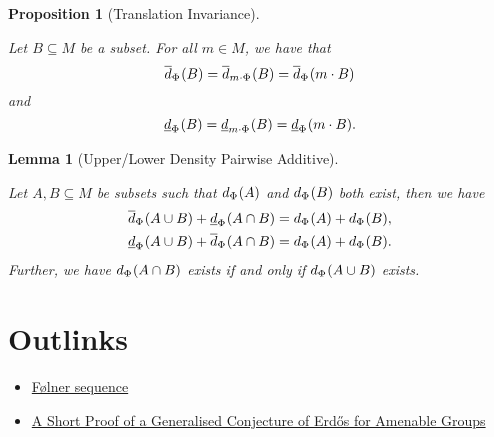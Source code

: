 \documentclass[
  british,
]{article}
\providecommand{\tightlist}{%
  \setlength{\itemsep}{0pt}\setlength{\parskip}{0pt}}
\theoremstyle{definition}
\theoremstyle{plain}
\newtheorem{lemma}{Lemma}[section]
\theoremstyle{plain}
\newtheorem{proposition}{Proposition}[section]
\theoremstyle{remark}
\newcommand{\Folner}[1][\vphantom{}]{{\Phi}_{#1}}
\newcommand{\UpperDensity}[2][\Folner]{\overline{d}_{{#1}}({#2})}
\newcommand{\LowerDensity}[2][\Folner]{\underline{d}_{{#1}}({#2})}
\newcommand{\Density}[2][\Folner]{d_{{#1}}({#2})}
\newcommand{\Monoid}{{M}}
\newcommand{\MonoidOperation}[2]{{#1}\cdot{#2}}
\newcommand{\MonoidElement}{{m}}
\begin{document}
\begin{proposition}[Translation
Invariance]\protect\hypertarget{prp-DensityTranslationInvariance}{}\label{prp-DensityTranslationInvariance}

Let \(B\subseteq\Monoid\) be a subset. For all
\(\MonoidElement\in\Monoid\), we have that
\[\UpperDensity{B}=\UpperDensity[\MonoidOperation{\MonoidElement}{\Folner}]{B}=\UpperDensity{\MonoidOperation{\MonoidElement}{B}}\]
and
\[\LowerDensity{B}=\LowerDensity[\MonoidOperation{\MonoidElement}{\Folner}]{B}=\LowerDensity{\MonoidOperation{\MonoidElement}{B}}.\]

\end{proposition}

\begin{lemma}[Upper/Lower Density Pairwise
Additive]\protect\hypertarget{lem-DensityPairwiseAdditivity}{}\label{lem-DensityPairwiseAdditivity}

Let \(A,B\subseteq\Monoid\) be subsets such that \(\Density{A}\) and
\(\Density{B}\) both exist, then we have \begin{align*}
    \UpperDensity{A\cup B}+\LowerDensity{A\cap B}&=\Density{A}+\Density{B},
    \\\LowerDensity{A\cup B}+\UpperDensity{A\cap B}&=\Density{A}+\Density{B}.
\end{align*} Further, we have \(\Density{A\cap B}\) exists if and only
if \(\Density{A\cup B}\) exists.

\end{lemma}

\section*{Outlinks}\label{sec-Outlinks}

\begin{itemize}
\tightlist
\item
  \href{../../MathsNotes/1_Amenable_and_Density/folner.html}{Følner sequence}
\item
  \href{../../GeneralisedErdosConjecture/ErdosConjecture.html}{A Short Proof of a Generalised Conjecture of Erdős for Amenable Groups}
\end{itemize}
\end{document}
